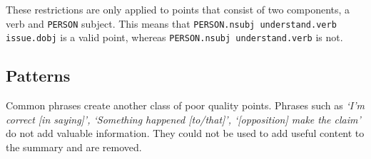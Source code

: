       These restrictions are only applied to points that consist of two components, a verb and \texttt{PERSON} subject. This means that \texttt{PERSON.nsubj understand.verb issue.dobj} is a valid point, whereas \texttt{PERSON.nsubj understand.verb} is not.

    \tocless\subsection{Patterns}
      Common phrases create another class of poor quality points. Phrases such as \textit{`I'm correct [in saying]', `Something happened [to/that]', `[opposition] make the claim'} do not add valuable information. They could not be used to add useful content to the summary and are removed.
